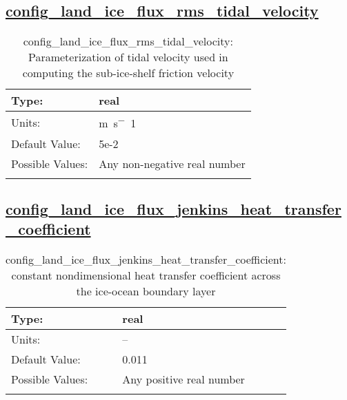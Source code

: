 \subsection[config\_land\_ice\_flux\_rms\_tidal\_velocity]{\hyperref[sec:nm_tab_land_ice_fluxes]{config\_land\_ice\_flux\_rms\_tidal\_velocity}}
\label{subsec:nm_sec_config_land_ice_flux_rms_tidal_velocity}
\begin{center}
\begin{longtable}{| p{2.0in} || p{4.0in} |}
    \hline
    Type: & real \\
    \hline
    Units: & \si{m.s^-1} \\
    \hline
    Default Value: & 5e-2 \\
    \hline
    Possible Values: & Any non-negative real number \\
    \hline
    \caption{config\_land\_ice\_flux\_rms\_tidal\_velocity: Parameterization of tidal velocity used in computing the sub-ice-shelf friction velocity}
\end{longtable}
\end{center}
\subsection[config\_land\_ice\_flux\_jenkins\_heat\_transfer\_coefficient]{\hyperref[sec:nm_tab_land_ice_fluxes]{config\_land\_ice\_flux\_jenkins\_heat\_transfer\_coefficient}}
\label{subsec:nm_sec_config_land_ice_flux_jenkins_heat_transfer_coefficient}
\begin{center}
\begin{longtable}{| p{2.0in} || p{4.0in} |}
    \hline
    Type: & real \\
    \hline
    Units: & -- \\
    \hline
    Default Value: & 0.011 \\
    \hline
    Possible Values: & Any positive real number \\
    \hline
    \caption{config\_land\_ice\_flux\_jenkins\_heat\_transfer\_coefficient: constant nondimensional heat transfer coefficient across the ice-ocean boundary layer}
\end{longtable}
\end{center}

